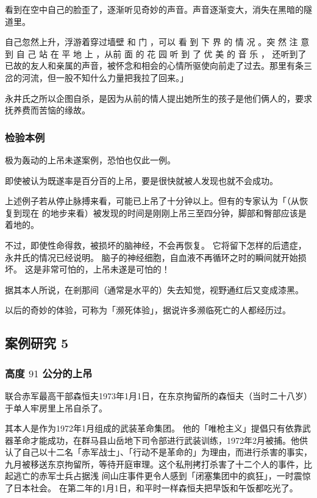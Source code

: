 \documentclass[UTF8]{ctexart}
\begin{document}
看到在空中自己的脸歪了，逐渐听见奇妙的声音。声音逐渐变大，消失在黑暗的隧道里。

自己忽然上升，浮游着穿过墙壁 和 门 ，可以 看 到 下 界 的 情 况 。突 然 注 意 到 自 己 站 在 平 地 上 ，从前 面 的 花 园 听 到 了 优 美 的 音 乐 ， 还听到了已故的友人和亲属的声音，被怀念和相会的心情所驱使向前走了过去。那里有条三岔的河流，但一股不知什么力量把我拉了回来。」 

永井氏之所以企图自杀，是因为从前的情人提出她所生的孩子是他们俩人的，要求抚养费而苦恼的缘故。

\subsubsection*{检验本例}

极为轰动的上吊未遂案例，恐怕也仅此一例。

即使被认为既遂率是百分百的上吊，要是很快就被人发现也就不会成功。

上述例子若从停止脉搏来看，可能已上吊了十分钟以上。但有的专家认为「（从恢复到现在
的地步来看）被发现的时间是刚刚上吊三至四分钟，脚部和臀部应该是着地的。

不过，即使性命得救，被损坏的脑神经，不会再恢复。
它将留下怎样的后遗症，永井氏的情况已经说明。
脑子的神经细胞，自血液不再循环之时的瞬间就开始损坏。
这是非常可怕的，上吊未遂是可怕的！

据其本人所说，在剎那间（通常是水平的）失去知觉，视野通红后又变成漆黑。

以后的奇妙的体验，可称为「濒死体验」，据说许多濒临死亡的人都经历过。

\subsection{案例研究 5}
\subsubsection*{高度 $91$ 公分的上吊}

联合赤军最高干部森恒夫1973年1月1日，在东京拘留所的森恒夫（当时二十八岁）于单人牢房里上吊自杀了。

其本人是作为1972年1月组成的武装革命集团。
他的「唯枪主义」提倡只有依靠武器革命才能成功，在群马县山岳地下司令部进行武装训练，1972年2月被捕。他供认了自己以十二名「赤军战士」、「行动不是革命的」为理由，而进行杀害的事实，九月被移送东京拘留所，等待开庭审理。这个私刑拷打杀害了十二个人的事件，比起逃亡的赤军士兵占据浅 间山庄事件更令人感到「闭塞集团中的疯狂」，一时震惊了日本社会。 在第二年的1月1日，和平时一样森恒夫把早饭和午饭都吃光了。
\end{document}
